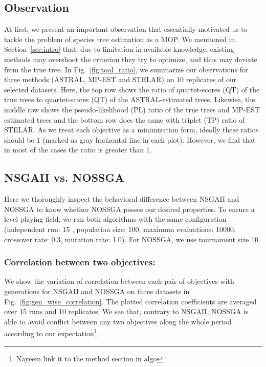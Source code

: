 \subsection{Observation}
\label{subsec:observation}
At first, we present an important observation that essentially motivated us to tackle the problem of species tree estimation as a MOP. We mentioned in Section~\ref{sec:intro} that, due to limitation in available knowledge, existing methods may overshoot the criterion they try to optimize, and thus may deviate from the true tree. In Fig.~\ref{fig:tool_ratio}, we summarize our observations for three methods (ASTRAL, MP-EST and STELAR) on 10 replicates of our selected datasets. Here, the top row shows the ratio of quartet-scores (QT) of the true trees to quartet-scores (QT) of the ASTRAL-estimated trees. Likewise, the middle row shows the pseudo-likelihood (PL) ratio of the true trees and MP-EST estimated trees and the bottom row does the same with triplet (TP) ratio of STELAR. As we treat each objective as a minimization form, ideally these ratios should be 1 (marked as gray horizontal line in each plot). However, we find that in most of the cases the ratio is greater than 1. %


\subsection{NSGAII vs. NOSSGA}
Here we thoroughly inspect the behavioral difference between NSGAII and NOSSGA to know whether NOSSGA posses our desired properties. To ensure a level playing field, we ran both algorithms with the same configuration (independent run: 15 , population size: 100, maximum evaluations: 10000, crossover rate: 0.3, mutation rate: 1.0). For NOSSGA, we use tournament size 10.


\subsubsection{Correlation between two objectives:} We show the variation of correlation between each pair of objectives with generations for NSGAII and NOSSGA on three datasets in Fig.~\ref{fig:gen_wise_correlation}. The plotted correlation coefficients are averaged over 15 runs and 10 replicates. We see that, contrary to NSGAII, NOSSGA is able to avoid conflict between any two objectives along the whole period according to our expectation\footnote{Nayeem link it to the method section in algo}. 

